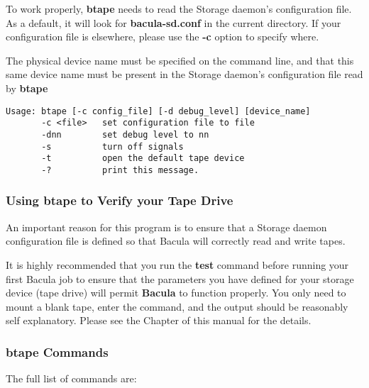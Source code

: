 To work properly, {\bf btape} needs to read the Storage daemon's configuration
file. As a default, it will look for {\bf bacula-sd.conf} in the current
directory. If your configuration file is elsewhere, please use the {\bf -c}
option to specify where. 

The physical device name must be specified on the command line, and that this
same device name must be present in the Storage daemon's configuration file
read by {\bf btape} 

\footnotesize
\begin{verbatim}
Usage: btape [-c config_file] [-d debug_level] [device_name]
       -c <file>   set configuration file to file
       -dnn        set debug level to nn
       -s          turn off signals
       -t          open the default tape device
       -?          print this message.
\end{verbatim}
\normalsize

\subsubsection*{Using btape to Verify your Tape Drive}

An important reason for this program is to ensure that a Storage daemon
configuration file is defined so that Bacula will correctly read and write
tapes. 

It is highly recommended that you run the {\bf test} command before running
your first Bacula job to ensure that the parameters you have defined for your
storage device (tape drive) will permit {\bf Bacula} to function properly. You
only need to mount a blank tape, enter the command, and the output should be
reasonably self explanatory. Please see the 
 Chapter of this manual for
the details. 

\subsubsection*{btape Commands}

The full list of commands are: 

